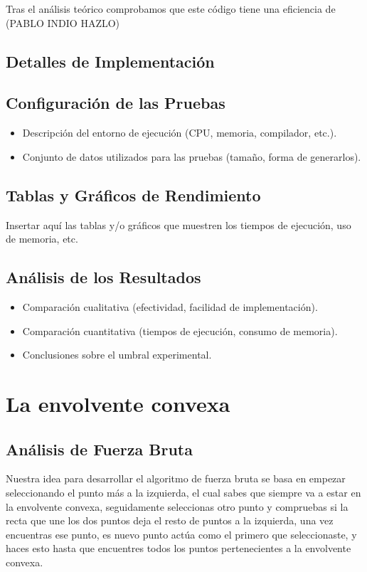 \documentclass[a4paper,12pt]{article}
\begin{document}
Tras el análisis teórico comprobamos que este código tiene una eficiencia de (PABLO INDIO HAZLO)

\subsection{Detalles de Implementación}

\subsection{Configuración de las Pruebas}
\begin{itemize}
	\item Descripción del entorno de ejecución (CPU, memoria, compilador, etc.).
	\item Conjunto de datos utilizados para las pruebas (tamaño, forma de generarlos).
\end{itemize}

\subsection{Tablas y Gráficos de Rendimiento}
Insertar aquí las tablas y/o gráficos que muestren los tiempos de ejecución,
uso de memoria, etc.

\subsection{Análisis de los Resultados}
\begin{itemize}
	\item Comparación cualitativa (efectividad, facilidad de implementación).
	\item Comparación cuantitativa (tiempos de ejecución, consumo de memoria).
	\item Conclusiones sobre el umbral experimental.
\end{itemize}


\section{La envolvente convexa}
\subsection{Análisis de Fuerza Bruta}

Nuestra idea para desarrollar el algoritmo de fuerza bruta se basa en empezar seleccionando el punto más a la izquierda, el cual sabes que siempre va a estar en la envolvente convexa, seguidamente seleccionas otro punto y compruebas si la recta que une los dos puntos deja el resto de puntos a la izquierda, una vez encuentras ese punto, es nuevo punto actúa como el primero que seleccionaste, y haces esto hasta que encuentres todos los puntos pertenecientes a la envolvente convexa.
\end{document}

